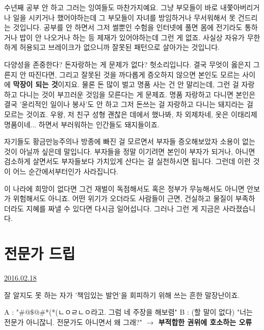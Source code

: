 수년째 공부 안 하고 그러는 잉여들도 마찬가지예요.
그냥 부모들이 바로 내쫓아버리거나 일을 시키거나 했어야하는데 그 부모들이 자녀를 방임하거나 무서워해서 못 건드리는 것입니다.
공부를 안 하면서 그저 썰뿐인 수험을 인터넷에 풀면 몸에 전기라도 통하거나 밥이 안 나오거나 하는 등 제재가 있어야하는데 그런 게 없죠.
사실상 자유가 무한하게 허용되고 브레이크가 없으니까 잘못된 패턴으로 살아가는 것입니다.
\vspace{5mm}

다양성을 존중한다? 돈자랑하는 게 문제가 없다? 헛소리입니다.
결국 무엇이 옳은지 그른지 안 따진다면, 그리고 잘못된 것을 까다롭게 증오하지 않으면 본인도 모르는 사이에 \textbf{막장이 되는 것}이지요.
물론 돈 많이 벌고 명품 사는 건 안 말리는데, 그런 걸 자랑하고 다니는 것이 부끄러운 것임을 모른다는 게 문제죠.
명품 자랑하고 다니면 본인은 결국 '윤리적인 일이나 봉사'도 안 하고 그저 돈쓰는 걸 자랑하고 다니는 돼지라는 걸 모르는 것이죠.
우왕, 저 친구 성형 괜찮은 데에서 했나봐, 차 외제차네, 옷은 이태리제 명품이네... 하면서 부러워하는 인간들도 돼지들이죠.
\vspace{5mm}

자기들도 황금만능주의나 방종에 빠진 걸 모르면서 부자들 증오해보았자 소용이 없는 것이 아닐까 싶은데 말입니다.
부자들을 정말 이기려면 본인이 부자가 되거나, 아니면 검소하게 살면서도 부자들보다 가치있게 산다는 걸 실천하시면 됩니다.
그런데 이런 것이 어느 순간에서부터인가 사라집니다.
\vspace{5mm}

이 나라에 희망이 없다면 그건 재벌이 독점해서도 혹은 정부가 무능해서도 아니면 안보가 위험해서도 아니죠.
어떤 위기가 오더라도 사람들이 근면, 건실하고 물질이 부족하더라도 지혜를 짜낼 수 있다면 다시금 일어섭니다.
그러나 그런 게 지금은 사라졌습니다.
\vspace{5mm}











\section{전문가 드립}
\href{https://www.kockoc.com/Apoc/640751}{2016.02.18}

\vspace{5mm}

잘 알지도 못 하는 자가 '책임있는 발언'을 회피하기 위해 쓰는 흔한 말장난이죠.
\vspace{5mm}

A : "$\#@\$@\#$*(*(ㄴㅇㄹㄴㅇ라고. 그럼 네 주장을 해보렴"
B : (할 말이 없다) "너는 전문가 아니잖니. 전문가도 아니면서 왜 그래?" \textbf{$\rightarrow$ 부적합한 권위에 호소하는 오류}
\vspace{5mm}

